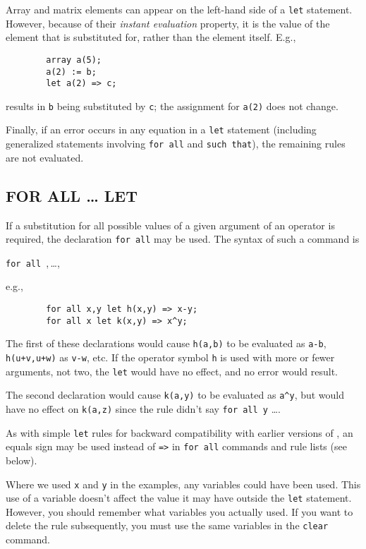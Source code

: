 Array and matrix elements can appear on the left-hand side of a \texttt{let}
statement. However, because of their
\emph{instant evaluation} property, it is the value of the element that
is substituted for, rather than the element itself.  E.g.,
\begin{verbatim}
        array a(5);
        a(2) := b;
        let a(2) => c;
\end{verbatim}
results in \texttt{b} being substituted by \texttt{c}; the assignment for
\texttt{a(2)} does not change.

Finally, if an error occurs in any equation in a \texttt{let} statement
(including generalized statements involving \texttt{for all} and
\texttt{such that}), the remaining rules are not evaluated.

\subsection{FOR ALL \ldots{} LET}
\hypertarget{command:FORALL}{}
If a substitution for all possible values of a given argument of an
operator is required, the declaration \texttt{for all} may be used. The
syntax of such a command is
\begin{syntax}
  \texttt{for all },\,\dots,\,\
\end{syntax}
e.g.,
\begin{verbatim}
        for all x,y let h(x,y) => x-y;
        for all x let k(x,y) => x^y;
\end{verbatim}
The first of these declarations would cause \texttt{h(a,b)} to be evaluated
as \texttt{a-b}, \texttt{h(u+v,u+w)} as \texttt{v-w}, etc.  If the operator
symbol \texttt{h} is used with more or fewer arguments, not two, the
\texttt{let} would have no effect, and no error would result.

The second declaration would cause \texttt{k(a,y)} to be evaluated as
\texttt{a\textasciicircum y}, but would have no effect on \texttt{k(a,z)} since the rule
didn't say \texttt{for all y} \ldots .

As with simple \texttt{let} rules for backward compatibility with earlier
versions of \REDUCE, an equals sign may be used instead of \texttt{=>}
in \texttt{for all} commands and rule lists (see below).

Where we used \texttt{x} and \texttt{y} in the examples, any variables could
have been used.  This use of a variable doesn't affect the value it may
have outside the \texttt{let} statement.  However, you should remember what
variables you actually used.  If you want to delete the rule subsequently,
you must use the same variables in the \texttt{clear} command.

